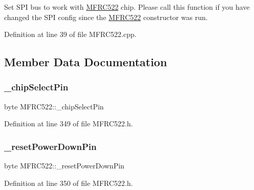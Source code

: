 Set S\+PI bus to work with \hyperlink{class_m_f_r_c522}{M\+F\+R\+C522} chip. Please call this function if you have changed the S\+PI config since the \hyperlink{class_m_f_r_c522}{M\+F\+R\+C522} constructor was run. 

Definition at line 39 of file M\+F\+R\+C522.\+cpp.



\subsection{Member Data Documentation}
\mbox{\label{class_m_f_r_c522_affaa7030ec6e5984cce845a8ed6df1b2}} 
\subsubsection{\texorpdfstring{\+\_\+chip\+Select\+Pin}{\_chipSelectPin}}
{\footnotesize\ttfamily byte M\+F\+R\+C522\+::\+\_\+chip\+Select\+Pin\hspace{0.3cm}{\ttfamily [private]}}



Definition at line 349 of file M\+F\+R\+C522.\+h.

\mbox{\label{class_m_f_r_c522_a3885cb4bb582de0045cff2829d59006f}} 
\subsubsection{\texorpdfstring{\+\_\+reset\+Power\+Down\+Pin}{\_resetPowerDownPin}}
{\footnotesize\ttfamily byte M\+F\+R\+C522\+::\+\_\+reset\+Power\+Down\+Pin\hspace{0.3cm}{\ttfamily [private]}}



Definition at line 350 of file M\+F\+R\+C522.\+h.

\mbox{\label{class_m_f_r_c522_a7bdf27d2122006aabd423ad71495e5f1}} 
